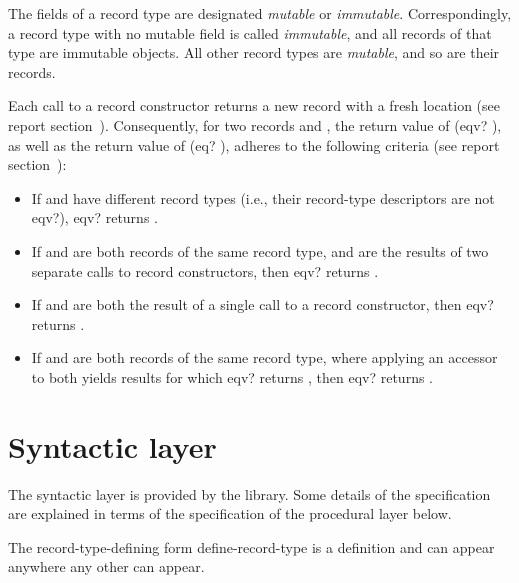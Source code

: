 The fields of a record type are designated \textit{mutable} or
\textit{immutable}.  Correspondingly, a record type with no mutable
field is called \textit{immutable}, and all records of that type
are immutable objects.  All other record types are \textit{mutable},
and so are their records.

Each call to a record constructor returns a new record with a fresh
location (see report section~).  Consequently, for two records  and ,
the return value of {\cf (eqv?  )}, as well as the
return value of {\cf (eq?  )}, adheres to
the following criteria (see report
section~):

\begin{itemize}
\item If  and  have different record types (i.e.,
  their record-type descriptors are not {\cf eqv?}), {\cf eqv?}
  returns \schfalse.
\item If  and  are both records of the
  same record type, and are the results of two separate calls to
  record constructors, then {\cf eqv?} returns \schfalse.
\item If  and  are both the result of a single call to a
  record constructor, then {\cf eqv?} returns \schtrue.
\item If  and  are both records of the same
  record type, where applying an accessor to both yields results
  for which {\cf eqv?} returns \schfalse, then {\cf eqv?} returns \schfalse.
\end{itemize}


\section{Syntactic layer}
\label{recordssyntacticsection}

The syntactic layer is provided by the  library.  Some details of the specification are
explained in terms of the specification of the procedural layer below.

The record-type-defining form {\cf define-record-type} is a definition and
can appear anywhere any other  can appear.


